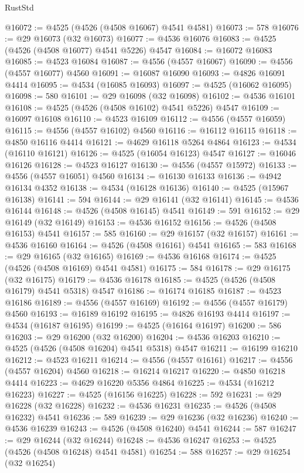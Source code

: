 \begin{lexlean}{RustStd}
\begin{coremodule}
@16072 := @4525 (@4526 (@4508 @16067) @4541 @4581)
@16073 := 578
@16076 := @29 @16073 (@32 @16073)
@16077 := @4536 @16076
@16083 := @4525 (@4526 (@4508 @16077) @4541 @5226) @4547
@16084 := @16072 @16083
@16085 := @4523 @16084
@16087 := @4556 (@4557 @16067)
@16090 := @4556 (@4557 @16077) @4560
@16091 := @16087 @16090
@16093 := @4826 @16091 @4414
@16095 := @4534 (@16085 @16093)
@16097 := @4525 (@16062 @16095)
@16098 := 580
@16101 := @29 @16098 (@32 @16098)
@16102 := @4536 @16101
@16108 := @4525 (@4526 (@4508 @16102) @4541 @5226) @4547
@16109 := @16097 @16108
@16110 := @4523 @16109
@16112 := @4556 (@4557 @16059)
@16115 := @4556 (@4557 @16102) @4560
@16116 := @16112 @16115
@16118 := @4850 @16116 @4414
@16121 := @4629 @16118 @5264 @4864
@16123 := @4534 (@16110 @16121)
@16126 := @4525 (@16054 @16123) @4547
@16127 := @16046 @16126
@16128 := @4523 @16127
@16130 := @4556 (@4557 @15972)
@16133 := @4556 (@4557 @16051) @4560
@16134 := @16130 @16133
@16136 := @4942 @16134 @4352
@16138 := @4534 (@16128 @16136)
@16140 := @4525 (@15967 @16138)
@16141 := 594
@16144 := @29 @16141 (@32 @16141)
@16145 := @4536 @16144
@16148 := @4526 (@4508 @16145) @4541
@16149 := 591
@16152 := @29 @16149 (@32 @16149)
@16153 := @4536 @16152
@16156 := @4526 (@4508 @16153) @4541
@16157 := 585
@16160 := @29 @16157 (@32 @16157)
@16161 := @4536 @16160
@16164 := @4526 (@4508 @16161) @4541
@16165 := 583
@16168 := @29 @16165 (@32 @16165)
@16169 := @4536 @16168
@16174 := @4525 (@4526 (@4508 @16169) @4541 @4581)
@16175 := 584
@16178 := @29 @16175 (@32 @16175)
@16179 := @4536 @16178
@16185 := @4525 (@4526 (@4508 @16179) @4541 @5318) @4547
@16186 := @16174 @16185
@16187 := @4523 @16186
@16189 := @4556 (@4557 @16169)
@16192 := @4556 (@4557 @16179) @4560
@16193 := @16189 @16192
@16195 := @4826 @16193 @4414
@16197 := @4534 (@16187 @16195)
@16199 := @4525 (@16164 @16197)
@16200 := 586
@16203 := @29 @16200 (@32 @16200)
@16204 := @4536 @16203
@16210 := @4525 (@4526 (@4508 @16204) @4541 @5318) @4547
@16211 := @16199 @16210
@16212 := @4523 @16211
@16214 := @4556 (@4557 @16161)
@16217 := @4556 (@4557 @16204) @4560
@16218 := @16214 @16217
@16220 := @4850 @16218 @4414
@16223 := @4629 @16220 @5356 @4864
@16225 := @4534 (@16212 @16223)
@16227 := @4525 (@16156 @16225)
@16228 := 592
@16231 := @29 @16228 (@32 @16228)
@16232 := @4536 @16231
@16235 := @4526 (@4508 @16232) @4541
@16236 := 589
@16239 := @29 @16236 (@32 @16236)
@16240 := @4536 @16239
@16243 := @4526 (@4508 @16240) @4541
@16244 := 587
@16247 := @29 @16244 (@32 @16244)
@16248 := @4536 @16247
@16253 := @4525 (@4526 (@4508 @16248) @4541 @4581)
@16254 := 588
@16257 := @29 @16254 (@32 @16254)

\end{coremodule}
\end{lexlean}
